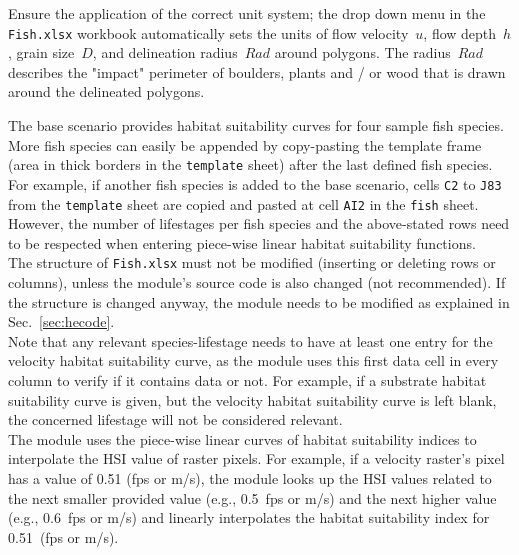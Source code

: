 Ensure the application of the correct unit system; the drop down menu in the \texttt{Fish.xlsx} workbook automatically sets the units of flow velocity~$u$, flow depth~$h$, grain size~$D$, and delineation radius~$Rad$ around polygons. The radius~$Rad$ describes the "impact" perimeter of boulders, plants and / or wood that is drawn around the delineated polygons.

The base scenario provides habitat suitability curves for four sample fish species. More fish species can easily be appended by copy-pasting the template frame (area in thick borders in the \texttt{template} sheet) after the last defined fish species. For example, if another fish species is added to the base scenario, cells \texttt{C2} to \texttt{J83} from the \texttt{template} sheet are copied and pasted at cell \texttt{AI2} in the \texttt{fish} sheet. However, the number of lifestages per fish species and the above-stated rows need to be respected when entering piece-wise linear habitat suitability functions.\\
The structure of \texttt{Fish.xlsx} must not be modified (inserting or deleting rows or columns), unless the module's source code is also changed (not recommended). If the structure is changed anyway, the module needs to be modified as explained in Sec.~\ref{sec:hecode}.\\
Note that any relevant species-lifestage needs to have at least one entry for the velocity habitat suitability curve, as the module uses this first data cell in every column to verify if it contains data or not. For example, if a substrate habitat suitability curve is given, but the velocity habitat suitability curve is left blank, the concerned lifestage will not be considered relevant.\\

The module uses the piece-wise linear curves of habitat suitability indices to interpolate the HSI value of raster pixels. For example, if a velocity raster's pixel has a value of 0.51 (fps or m/s), the module looks up the HSI values related to the next smaller provided value (e.g., 0.5~fps or m/s) and the next higher value (e.g., 0.6~fps or m/s) and linearly interpolates the habitat suitability index for 0.51~(fps or m/s).


